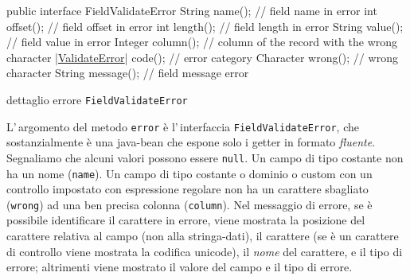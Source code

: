 \documentclass[a4paper,10pt]{report}
\newif\ifesource
\newenvironment{elisting}[1][H]
  {\captionsetup{aboveskip=0pt}\begin{listing}[#1]}
  {\end{listing}%
}
\begin{document}
\ifesource
\begin{figure*}[!htb]
\begin{lstlisting}[language=java, 
caption={dettaglio errore \texttt{FieldValidateError}}, 
label=lst:FieldValidateError:java]
public interface FieldValidateError {
    String name();          // field name in error
    int offset();           // field offset in error
    int length();           // field length in error
    String value();         // field value in error
    Integer column();       // column of the record with the wrong character
    (*\hyperref[lst:ValidateError:java]{ValidateError}*) code();   // error category
    Character wrong();      // wrong character
    String message();       // field message error
}
\end{lstlisting}
\end{figure*}
\else
\begin{elisting}[!htb]
\begin{javacode}
public interface FieldValidateError {
    String name();          // field name in error
    int offset();           // field offset in error
    int length();           // field length in error
    String value();         // field value in error
    Integer column();       // column of the record with the wrong character
    |\hyperref[lst:ValidateError:java]{ValidateError}| code();   // error category
    Character wrong();      // wrong character
    String message();       // field message error
}
\end{javacode}
\caption{dettaglio errore \texttt{FieldValidateError}}
\label{lst:FieldValidateError:java}
\end{elisting}
\fi

L'\,argomento del metodo \texttt{error} è l'\,interfaccia
\texttt{FieldValidateError}, che sostanzialmente è una java-bean che espone solo
i getter in formato \textit{fluente}.
Segnaliamo che alcuni valori possono essere \texttt{null}.
Un campo di tipo costante non ha un nome (\texttt{name}). 
Un campo di tipo costante o dominio o custom con un controllo impostato con 
espressione regolare non ha un carattere sbagliato (\texttt{wrong})
ad una ben precisa colonna (\texttt{column}).
Nel messaggio di errore, se è possibile identificare il carattere in
errore, viene mostrata la posizione del carattere relativa al campo (non alla 
stringa-dati), il carattere (se è un carattere di controllo viene mostrata la
codifica unicode), il \textit{nome} del carattere, e il tipo di errore; 
altrimenti viene mostrato il valore del campo e il tipo di errore.
\end{document}

